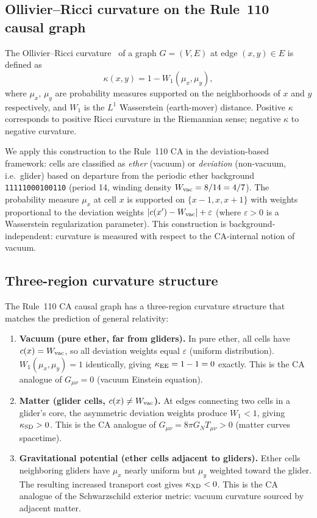 \documentclass[11pt]{article}
\theoremstyle{remark}
\newcommand{\Tvac}{W_{\rm vac}}
\begin{document}
\subsection{Ollivier--Ricci curvature on the Rule~110 causal graph}
\label{ssec:ollivier_def}

The Ollivier--Ricci curvature~\cite{Ollivier2007,Ollivier2009} of a graph
$G = (V, E)$ at edge $(x, y) \in E$ is defined as
\begin{equation}
  \kappa(x, y) = 1 - W_1(\mu_x, \mu_y),
  \label{eq:ollivier}
\end{equation}
where $\mu_x$, $\mu_y$ are probability measures supported on the
neighborhoods of $x$ and $y$ respectively, and $W_1$ is the
$L^1$ Wasserstein (earth-mover) distance.
Positive $\kappa$ corresponds to positive Ricci curvature in the Riemannian
sense; negative $\kappa$ to negative curvature.

We apply this construction to the Rule~110 CA in the deviation-based
framework:
cells are classified as \emph{ether} (vacuum) or \emph{deviation}
(non-vacuum, i.e.\ glider) based on departure from the periodic ether
background \texttt{11111000100110} (period 14, winding density
$W_{\rm vac} = 8/14 = 4/7$).
The probability measure $\mu_x$ at cell $x$ is supported on
$\{x-1, x, x+1\}$ with weights proportional to the deviation weights
$|c(x') - \Tvac| + \varepsilon$ (where $\varepsilon > 0$ is a
Wasserstein regularization parameter).
This construction is background-independent: curvature is measured with
respect to the CA-internal notion of vacuum.

\subsection{Three-region curvature structure}
\label{ssec:three_regions}

The Rule~110 CA causal graph has a three-region curvature structure that
matches the prediction of general relativity:

\begin{enumerate}[label=\textbf{Region~\arabic*.}]
\item \textbf{Vacuum (pure ether, far from gliders).}
In pure ether, all cells have $c(x) = \Tvac$, so all deviation weights
equal $\varepsilon$ (uniform distribution).
$W_1(\mu_x, \mu_y) = 1$ identically, giving
$\kappa_{\rm EE} = 1 - 1 = 0$ exactly.
This is the CA analogue of $G_{\mu\nu} = 0$ (vacuum Einstein equation).

\item \textbf{Matter (glider cells, $c(x) \neq \Tvac$).}
At edges connecting two cells in a glider's core, the asymmetric deviation
weights produce $W_1 < 1$, giving $\kappa_{\rm SD} > 0$.
This is the CA analogue of $G_{\mu\nu} = 8\pi G_N T_{\mu\nu} > 0$
(matter curves spacetime).

\item \textbf{Gravitational potential (ether cells adjacent to gliders).}
Ether cells neighboring gliders have $\mu_x$ nearly uniform but $\mu_y$
weighted toward the glider.
The resulting increased transport cost gives $\kappa_{\rm XD} < 0$.
This is the CA analogue of the Schwarzschild exterior metric:
vacuum curvature sourced by adjacent matter.
\end{enumerate}
\end{document}
